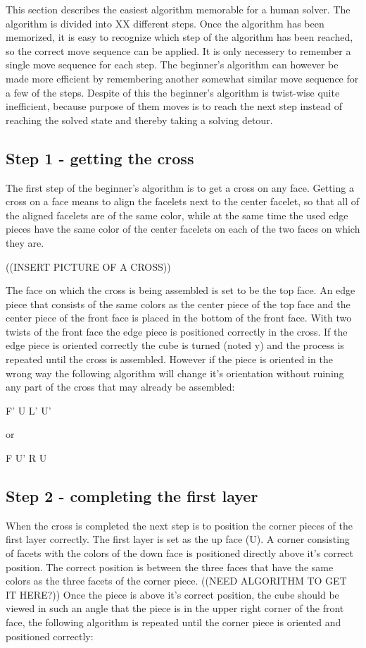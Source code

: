 
\label{sec:beginner}

This section describes the easiest algorithm memorable for a human solver. The algorithm is divided into XX different steps. Once the algorithm has been memorized, it is easy to recognize which step of the algorithm has been reached, so the correct move sequence can be applied. It is only necessery to remember a single move sequence for each step. The beginner's algorithm can however be made more efficient by remembering another somewhat similar move sequence for a few of the steps. Despite of this the beginner's algorithm is twist-wise quite inefficient, because purpose of them moves is to reach the next step instead of reaching the solved state and thereby taking a solving detour. 

\subsection{Step 1 - getting the cross}
The first step of the beginner's algorithm is to get a cross on any face. Getting a cross on a face means to align the facelets next to the center facelet, so that all of the aligned facelets are of the same color, while at the same time the used edge pieces have the same color of the center facelets on each of the two faces on which they are.

((INSERT PICTURE OF A CROSS))

The face on which the cross is being assembled is set to be the top face. An edge piece that consists of the same colors as the center piece of the top face and the center piece of the front face is placed in the bottom of the front face. With two twists of the front face the edge piece is positioned correctly in the cross. If the edge piece is oriented correctly the cube is turned (noted y) and the process is repeated until the cross is assembled. However if the piece is oriented in the wrong way the following algorithm will change it's orientation without ruining any part of the cross that may already be assembled:

F' U L' U'

or

F U' R U

\subsection{Step 2 - completing the first layer}
When the cross is completed the next step is to position the corner pieces of the first layer correctly. The first layer is set as the up face (U). A corner consisting of facets with the colors of the down face is positioned directly above it's correct  position. The correct position is between the three faces that have the same colors as the three facets of the corner piece. ((NEED ALGORITHM TO GET IT HERE?)) Once the piece is above it's correct position, the cube should be viewed in such an angle that the piece is in the upper right corner of the front face, the following algorithm is repeated until the corner piece is oriented and positioned correctly:

